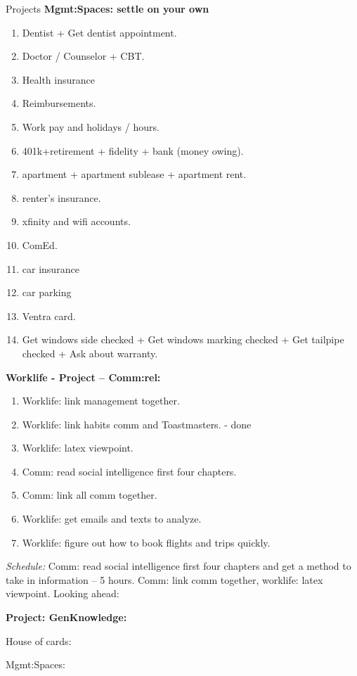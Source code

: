 \documentclass[serif, mathserif, final]{beamer}
\begin{document}
\begin{frame}
\begin{columns}
\begin{block}{Projects}
{\bf Mgmt:Spaces: settle on your own} 
\begin{enumerate} 
\item \tiny Dentist + Get dentist appointment.
\item \tiny Doctor / Counselor + CBT.
\item \tiny Health insurance 
\item \tiny Reimbursements.
\item \tiny Work pay and holidays / hours.
\item \tiny 401k+retirement  + fidelity + bank (money owing). 
\item \tiny apartment + apartment sublease + apartment rent. 
\item \tiny renter's insurance. 
\item \tiny xfinity and wifi accounts. 
\item \tiny ComEd. 
\item \tiny car insurance 
\item \tiny car parking 
\item \tiny Ventra card. 
\item \tiny Get windows side checked + Get windows marking checked +
  Get tailpipe checked + Ask about warranty. 
\end{enumerate} 

{\bf Worklife - Project – Comm:rel: } 
\begin{enumerate} 
\tiny \item \tiny Worklife: link management together.  
\item \tiny Worklife: link habits comm and Toastmasters. - done
\item \tiny Worklife: latex viewpoint. 
\item \tiny Comm: read social intelligence first four chapters.
\item \tiny Comm: link all comm together.
\item \tiny Worklife: get emails and texts to analyze. 
\item \tiny Worklife: figure out how to book flights and trips quickly. 
\end{enumerate}
\textit{Schedule:} Comm: read social intelligence first four chapters
and get a method to take in information – 5 hours. 
Comm: link comm together, worklife: latex viewpoint. Looking ahead:  


{\bf Project: GenKnowledge:} 

House of cards:

Mgmt:Spaces:


\end{block}
\end{columns}
\end{frame}
\end{document}
